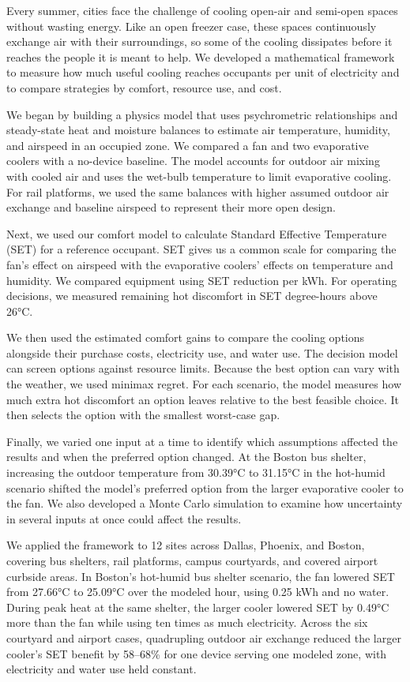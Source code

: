 Every summer, cities face the challenge of cooling open-air and semi-open spaces without wasting energy. Like an open freezer case, these spaces continuously exchange air with their surroundings, so some of the cooling dissipates before it reaches the people it is meant to help. We developed a mathematical framework to measure how much useful cooling reaches occupants per unit of electricity and to compare strategies by comfort, resource use, and cost.

We began by building a physics model that uses psychrometric relationships and steady-state heat and moisture balances to estimate air temperature, humidity, and airspeed in an occupied zone. We compared a fan and two evaporative coolers with a no-device baseline. The model accounts for outdoor air mixing with cooled air and uses the wet-bulb temperature to limit evaporative cooling. For rail platforms, we used the same balances with higher assumed outdoor air exchange and baseline airspeed to represent their more open design.

Next, we used our comfort model to calculate Standard Effective Temperature (SET) for a reference occupant. SET gives us a common scale for comparing the fan’s effect on airspeed with the evaporative coolers’ effects on temperature and humidity. We compared equipment using SET reduction per kWh. For operating decisions, we measured remaining hot discomfort in SET degree-hours above 26°C.

We then used the estimated comfort gains to compare the cooling options alongside their purchase costs, electricity use, and water use. The decision model can screen options against resource limits. Because the best option can vary with the weather, we used minimax regret. For each scenario, the model measures how much extra hot discomfort an option leaves relative to the best feasible choice. It then selects the option with the smallest worst-case gap.

Finally, we varied one input at a time to identify which assumptions affected the results and when the preferred option changed. At the Boston bus shelter, increasing the outdoor temperature from 30.39°C to 31.15°C in the hot-humid scenario shifted the model’s preferred option from the larger evaporative cooler to the fan. We also developed a Monte Carlo simulation to examine how uncertainty in several inputs at once could affect the results.

We applied the framework to 12 sites across Dallas, Phoenix, and Boston, covering bus shelters, rail platforms, campus courtyards, and covered airport curbside areas. In Boston’s hot-humid bus shelter scenario, the fan lowered SET from 27.66°C to 25.09°C over the modeled hour, using 0.25 kWh and no water. During peak heat at the same shelter, the larger cooler lowered SET by 0.49°C more than the fan while using ten times as much electricity. Across the six courtyard and airport cases, quadrupling outdoor air exchange reduced the larger cooler’s SET benefit by 58–68\% for one device serving one modeled zone, with electricity and water use held constant.

